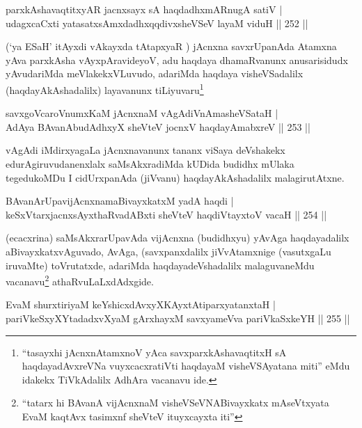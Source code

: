 \begin{shl}
parxkAshavaqtitxyAR jacnxsayx sA haqdadhxmARnugA satiV |\\
udagxcaCxti yatasatxsAmxdadhxqqdivxsheVSeV layaM viduH \hfill || 252 ||
\end{shl}

\begin{artha}
(`ya ESaH' itAyxdi vAkayxda tAtapxyaR  \mdash ) jAcnxna savxrUpanAda Atamxna yAva parxkAsha vAyxpAravideyoV, adu haqdaya dhamaRvanunx anusarisidudx yAvudariMda meVlakekxVLuvudo, adariMda haqdaya visheVSadalilx (haqdayAkAshadalilx) layavanunx tiLiyuvaru\footnote{``tasayxhi jAcnxnAtamxnoV yAca savxparxkAshavaqtitxH sA haqdayadAvxreVNa vuyxcacxratiVti haqdayaM visheVSAyatana miti'' eMdu idakekx TiVkAdalilx AdhAra vacanavu ide.}
\end{artha}

\begin{shl}
savxgoVcaroVnumxKaM jAcnxnaM vAgAdiVnAmasheVSataH |\\
AdAya BAvanAbudAdhxyX sheVteV jocnxV haqdayAmabxreV \hfill || 253 ||
\end{shl}

\begin{artha}
vAgAdi iMdirxyagaLa jAcnxnavanunx tananx viSaya deVshakekx edurAgiruvudanenxlalx saMsAkxradiMda kUDida budidhx mUlaka tegedukoMDu I cidUrxpanAda (jiVvanu) haqdayAkAshadalilx malagirutAtxne.
\end{artha}

\begin{shl}
BAvanArUpavijAcnxnamaBivayxkatxM yadA haqdi |\\
keSxVtarxjacnxsAyxthaRvadABxti sheVteV haqdiVtayxtoV vacaH \hfill || 254 ||
\end{shl}

\begin{artha}
(ecacxrina) saMsAkxrarUpavAda vijAcnxna (budidhxyu) yAvAga haqdayadalilx aBivayxkatxvAguvado, AvAga, (savxpanxdalilx jiVvAtamxnige (vasutxgaLu iruvaMte) toVrutatxde, adariMda haqdayadeVshadalilx malaguvaneMdu vacanavu\footnote{``tatarx hi BAvanA vijAcnxnaM visheVSeVNABivayxkatx mAseVtxyata EvaM kaqtAvx tasimxnf sheVteV ituyxcayxta  iti''} athaRvuLaLxdAdxgide.
\end{artha}


\begin{shl}
EvaM shurxtiriyaM keYshicxdAvxyXKAyxtA\s tiparxyatanxtaH |\\
pariVkeSxyXYtadadxvXyaM gArxhayxM savxyameVva pariVkaSxkeYH \hfill || 255 ||
\end{shl}

